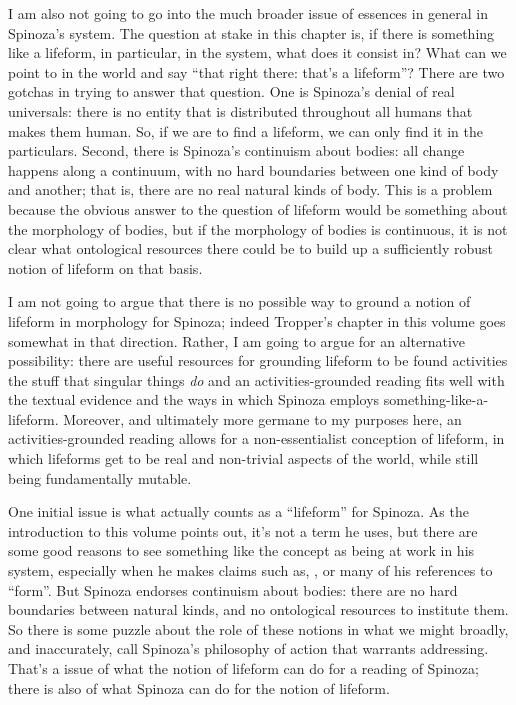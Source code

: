 \documentclass{article}
\newcommand{\dash}{\unskip{—}}
\begin{document}
I am also not going to go into the much broader issue of essences in general in Spinoza's system. The question at stake in this chapter is, if there is something like a lifeform, in particular, in the system, what does it consist in? What can we point to in the world and say \enquote{that right there: that's a lifeform}? There are two gotchas in trying to answer that question. One is Spinoza's denial of real universals: there is no entity that is distributed throughout all humans that makes them human. So, if we are to find a lifeform, we can only find it in the particulars. Second, there is Spinoza's continuism about bodies: all change happens along a continuum, with no hard boundaries between one kind of body and another; that is, there are no real natural kinds of body. This is a problem because the obvious answer to the question of lifeform would be something about the morphology of bodies, but if the morphology of bodies is continuous, it is not clear what ontological resources there could be to build up a sufficiently robust notion of lifeform on that basis.

I am not going to argue that there is no possible way to ground a notion of lifeform in morphology for Spinoza; indeed Tropper's chapter in this volume goes somewhat in that direction. Rather, I am going to argue for an alternative possibility: there are useful resources for grounding lifeform to be found activities \dash the stuff that singular things \emph{do} \dash and an activities-grounded reading fits well with the textual evidence and the ways in which Spinoza employs something-like-a-lifeform. Moreover, and ultimately more germane to my purposes here, an activities-grounded reading allows for a non-essentialist conception of lifeform, in which lifeforms get to be real and non-trivial aspects of the world, while still being fundamentally mutable.

One initial issue is what actually counts as a \enquote{lifeform} for Spinoza. As the introduction to this volume points out, it's not a term he uses, but there are some good reasons to see something like the concept as being at work in his system, especially when he makes claims such as, , or many of his references to \enquote{form}. But Spinoza endorses continuism about bodies: there are no hard boundaries between natural kinds, and no ontological resources to institute them. So there is some puzzle about the role of these notions in what we might broadly, and inaccurately, call Spinoza's philosophy of action that warrants addressing. That's a issue of what the notion of lifeform can do for a reading of Spinoza; there is also of what Spinoza can do for the notion of lifeform.
\end{document}
